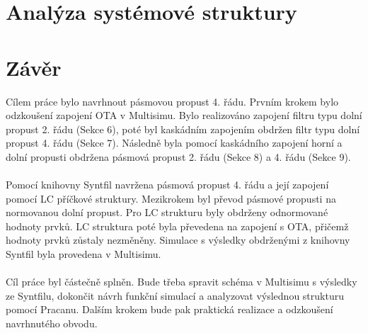 \documentclass[twoside]{article}
\begin{document}
\section{Analýza systémové struktury}
\section{Závěr}
\noindent Cílem práce bylo navrhnout pásmovou propust 4. řádu. Prvním krokem bylo odzkoušení zapojení OTA v Multisimu. Bylo realizováno zapojení filtru typu dolní propust 2. řádu (Sekce 6), poté byl kaskádním zapojením obdržen filtr typu dolní propust 4. řádu (Sekce 7). Následně byla pomocí kaskádního zapojení horní a dolní propusti obdržena pásmová propust 2. řádu (Sekce 8) a 4. řádu (Sekce 9).\\
\\
Pomocí knihovny Syntfil navržena pásmová propust 4. řádu a její zapojení pomocí LC příčkové struktury. Mezikrokem byl převod pásmové propusti na normovanou dolní propust. Pro LC strukturu byly obdrženy odnormované hodnoty prvků. LC struktura poté byla převedena na zapojení s OTA, přičemž hodnoty prvků zůstaly nezměněny. Simulace s výsledky obdrženými z knihovny Syntfil byla provedena v Multisimu.\\
\\
Cíl práce byl částečně splněn. Bude třeba spravit schéma v Multisimu s výsledky ze Syntfilu, dokončit návrh funkční simulací a analyzovat výslednou strukturu pomocí Pracanu. Dalším krokem bude pak praktická realizace a odzkoušení navrhnutého obvodu.
\end{document}
